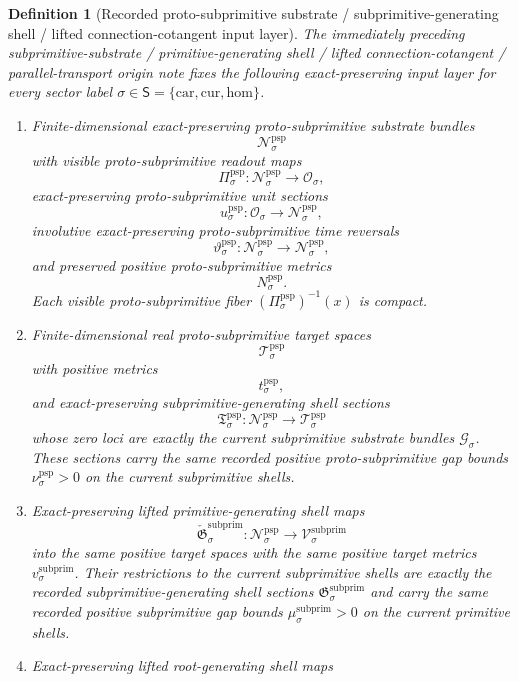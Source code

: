 \documentclass[11pt]{article}
\newcommand{\SectorSet}{\mathsf S}
\newcommand{\Car}{\mathrm{car}}
\newcommand{\Cur}{\mathrm{cur}}
\newcommand{\Hom}{\mathrm{hom}}
\newcommand{\ObjClass}[1]{\mathcal O_{#1}}
\newcommand{\SubprimTarget}[1]{\mathcal V_{#1}^{\mathrm{subprim}}}
\newcommand{\SubprimTargetMetric}[1]{v_{#1}^{\mathrm{subprim}}}
\newcommand{\SubprimGap}[1]{\mu_{#1}^{\mathrm{subprim}}}
\newcommand{\ProtoSubprimTarget}[1]{\mathcal T_{#1}^{\mathrm{psp}}}
\newcommand{\ProtoSubprimTargetMetric}[1]{t_{#1}^{\mathrm{psp}}}
\newcommand{\ProtoSubprimGap}[1]{\nu_{#1}^{\mathrm{psp}}}
\newcommand{\SubprimSpace}[1]{\mathcal G_{#1}}
\newcommand{\SubprimSection}[1]{\mathfrak G_{#1}^{\mathrm{subprim}}}
\newcommand{\ProtoSubprimSpace}[1]{\mathcal N_{#1}^{\mathrm{psp}}}
\newcommand{\ProtoSubprimRead}[1]{\Pi_{#1}^{\mathrm{psp}}}
\newcommand{\ProtoSubprimUnit}[1]{u_{#1}^{\mathrm{psp}}}
\newcommand{\ProtoSubprimTimeRev}[1]{\vartheta_{#1}^{\mathrm{psp}}}
\newcommand{\ProtoSubprimMetric}[1]{N_{#1}^{\mathrm{psp}}}
\newcommand{\ProtoSubprimSection}[1]{\mathfrak T_{#1}^{\mathrm{psp}}}
\newcommand{\ProtoSubprimLiftedPrimitive}[1]{\check{\mathfrak G}_{#1}^{\mathrm{subprim}}}
\newtheorem{definition}{Definition}
\begin{document}
\begin{definition}[Recorded proto-subprimitive substrate / subprimitive-generating shell / lifted connection-cotangent input layer]
\label{def:recorded_protosubprimitive_layer}
The immediately preceding subprimitive-substrate / primitive-generating shell / lifted connection-cotangent / parallel-transport origin note fixes the following exact-preserving input layer for every sector label \(\sigma\in\SectorSet=\{\Car,\Cur,\Hom\}\).
\begin{enumerate}
    \item Finite-dimensional exact-preserving proto-subprimitive substrate bundles
    \[
    \ProtoSubprimSpace{\sigma}
    \]
    with visible proto-subprimitive readout maps
    \[
    \ProtoSubprimRead{\sigma}:\ProtoSubprimSpace{\sigma}\to\ObjClass{\sigma},
    \]
    exact-preserving proto-subprimitive unit sections
    \[
    \ProtoSubprimUnit{\sigma}:\ObjClass{\sigma}\to\ProtoSubprimSpace{\sigma},
    \]
    involutive exact-preserving proto-subprimitive time reversals
    \[
    \ProtoSubprimTimeRev{\sigma}:\ProtoSubprimSpace{\sigma}\to\ProtoSubprimSpace{\sigma},
    \]
    and preserved positive proto-subprimitive metrics
    \[
    \ProtoSubprimMetric{\sigma}.
    \]
    Each visible proto-subprimitive fiber \((\ProtoSubprimRead{\sigma})^{-1}(x)\) is compact.
    \item Finite-dimensional real proto-subprimitive target spaces
    \[
    \ProtoSubprimTarget{\sigma}
    \]
    with positive metrics
    \[
    \ProtoSubprimTargetMetric{\sigma},
    \]
    and exact-preserving subprimitive-generating shell sections
    \[
    \ProtoSubprimSection{\sigma}:\ProtoSubprimSpace{\sigma}\to\ProtoSubprimTarget{\sigma}
    \]
    whose zero loci are exactly the current subprimitive substrate bundles \(\SubprimSpace{\sigma}\). These sections carry the same recorded positive proto-subprimitive gap bounds \(\ProtoSubprimGap{\sigma}>0\) on the current subprimitive shells.
    \item Exact-preserving lifted primitive-generating shell maps
    \[
    \ProtoSubprimLiftedPrimitive{\sigma}:\ProtoSubprimSpace{\sigma}\to\SubprimTarget{\sigma}
    \]
    into the same positive target spaces with the same positive target metrics \(\SubprimTargetMetric{\sigma}\). Their restrictions to the current subprimitive shells are exactly the recorded subprimitive-generating shell sections \(\SubprimSection{\sigma}\) and carry the same recorded positive subprimitive gap bounds \(\SubprimGap{\sigma}>0\) on the current primitive shells.
    \item Exact-preserving lifted root-generating shell maps

\end{enumerate}
\end{definition}
\end{document}
